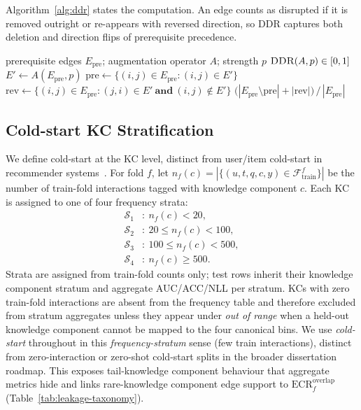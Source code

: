 \documentclass[pdflatex,sn-mathphys-num]{sn-jnl}
\newcommand{\Epre}{\ensuremath{E_{\text{pre}}}}
\newcommand{\KC}{knowledge component}
\newcommand{\DDR}{\textsc{DDR}}
\begin{document}
Algorithm~\ref{alg:ddr} states the computation. An edge counts as disrupted if
it is removed outright or re-appears with reversed direction, so \DDR{}
captures both deletion and direction flips of prerequisite precedence.

\begin{algorithm}[t]
\caption{DAG Disruption Rate (\DDR{})}
\label{alg:ddr}
\begin{algorithmic}[1]
\Require prerequisite edges $\Epre$; augmentation operator $A$; strength $p$
\Ensure $\DDR(A,p)\in[0,1]$
\State $E' \gets A(\Epre, p)$ 
\State $\mathrm{pre} \gets \{(i,j)\in\Epre : (i,j)\in E'\}$ 
\State $\mathrm{rev} \gets \{(i,j)\in\Epre : (j,i)\in E'\ \textbf{and}\ (i,j)\notin E'\}$ 
\State \Return $\big(|\Epre\setminus\mathrm{pre}| + |\mathrm{rev}|\big)\,/\,|\Epre|$
\end{algorithmic}
\end{algorithm}

\subsection{Cold-start KC Stratification}
\label{sec:cold-start}
We define cold-start at the KC level, distinct from user/item
cold-start in recommender systems~\cite{schein2002coldstart}. For fold
$f$, let $n_f(c)=|\{(u,t,q,c,y)\in\mathcal{F}_{\text{train}}^f\}|$ be
the number of train-fold interactions tagged with \KC{} $c$. Each KC
is assigned to one of four frequency strata:
\[
\begin{aligned}
\mathcal{S}_1&:\ n_f(c)<20,\\
\mathcal{S}_2&:\ 20\le n_f(c)<100,\\
\mathcal{S}_3&:\ 100\le n_f(c)<500,\\
\mathcal{S}_4&:\ n_f(c)\ge 500.
\end{aligned}
\]
Strata are assigned from train-fold counts only; test rows inherit their
\KC{} stratum and aggregate AUC/ACC/NLL per stratum. KCs with zero train-fold
interactions are absent from the frequency table and therefore excluded from
stratum aggregates unless they appear under \emph{out of range} when a held-out
\KC{} cannot be mapped to the four canonical bins. We use \emph{cold-start}
throughout in this \emph{frequency-stratum} sense (few train interactions),
distinct from zero-interaction or zero-shot cold-start splits in the broader
dissertation roadmap. This exposes tail-\KC{}
behaviour that aggregate metrics hide and links rare-\KC{} edge support to
$\mathrm{ECR}^{\mathrm{overlap}}_f$ (Table~\ref{tab:leakage-taxonomy}).
\end{document}
